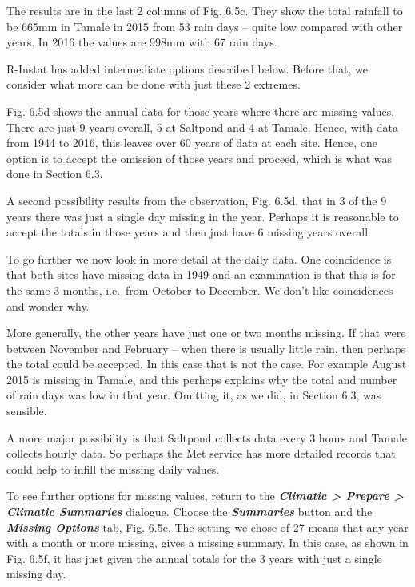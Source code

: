\documentclass[
  letterpaper,
  DIV=11,
  numbers=noendperiod]{scrreprt}
\begin{document}
The results are in the last 2 columns of Fig. 6.5c. They show the total
rainfall to be 665mm in Tamale in 2015 from 53 rain days -- quite low
compared with other years. In 2016 the values are 998mm with 67 rain
days.

R-Instat has added intermediate options described below. Before that, we
consider what more can be done with just these 2 extremes.

Fig. 6.5d shows the annual data for those years where there are missing
values. There are just 9 years overall, 5 at Saltpond and 4 at Tamale.
Hence, with data from 1944 to 2016, this leaves over 60 years of data at
each site. Hence, one option is to accept the omission of those years
and proceed, which is what was done in Section 6.3.

A second possibility results from the observation, Fig. 6.5d, that in 3
of the 9 years there was just a single day missing in the year. Perhaps
it is reasonable to accept the totals in those years and then just have
6 missing years overall.

To go further we now look in more detail at the daily data. One
coincidence is that both sites have missing data in 1949 and an
examination is that this is for the same 3 months, i.e.~from October to
December. We don't like coincidences and wonder why.

More generally, the other years have just one or two months missing. If
that were between November and February -- when there is usually little
rain, then perhaps the total could be accepted. In this case that is not
the case. For example August 2015 is missing in Tamale, and this perhaps
explains why the total and number of rain days was low in that year.
Omitting it, as we did, in Section 6.3, was sensible.

A more major possibility is that Saltpond collects data every 3 hours
and Tamale collects hourly data. So perhaps the Met service has more
detailed records that could help to infill the missing daily values.

To see further options for missing values, return to the
\textbf{\emph{Climatic \textgreater{} Prepare \textgreater{} Climatic
Summaries}} dialogue. Choose the \textbf{\emph{Summaries}} button and
the \textbf{\emph{Missing Options}} tab, Fig. 6.5e. The setting we chose
of 27 means that any year with a month or more missing, gives a missing
summary. In this case, as shown in Fig. 6.5f, it has just given the
annual totals for the 3 years with just a single missing day.
\end{document}
